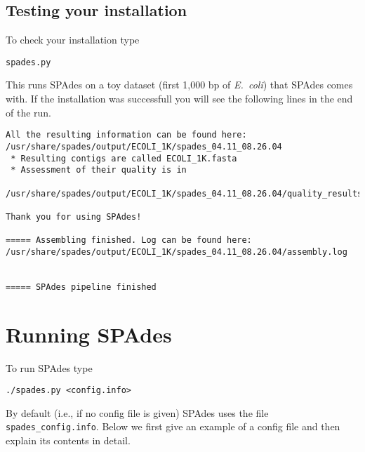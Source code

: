 \documentclass{article}
\def\spades{SPAdes}
\def\ecoli{\it E.~coli}
\begin{document}
\subsection{Testing your installation}
To check your installation type
\begin{lstlisting}
spades.py
\end{lstlisting}
This runs {\spades} on a toy dataset (first 1,000 bp of {\ecoli}) that {\spades} comes with. If the installation was successfull you will see the following lines in the end of the run.
\begin{lstlisting}
All the resulting information can be found here:
/usr/share/spades/output/ECOLI_1K/spades_04.11_08.26.04
 * Resulting contigs are called ECOLI_1K.fasta
 * Assessment of their quality is in
  /usr/share/spades/output/ECOLI_1K/spades_04.11_08.26.04/quality_results/

Thank you for using SPAdes!

===== Assembling finished. Log can be found here:
/usr/share/spades/output/ECOLI_1K/spades_04.11_08.26.04/assembly.log


===== SPAdes pipeline finished
\end{lstlisting}



\section{Running {\spades}}\label{sec:running}
To run {\spades} type
\begin{lstlisting}
./spades.py <config.info>
\end{lstlisting}
By default (i.e., if no config file is given) {\spades} uses the file {\tt spades\_config.info}. 
Below we first give an example of a config file
and then explain its contents in detail.
\end{document}
